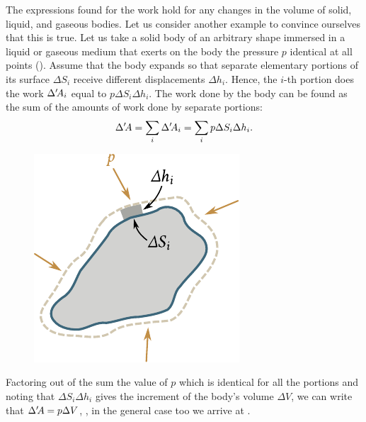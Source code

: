 The expressions found for the work hold for any changes in the volume of solid, liquid, and gaseous bodies. Let us consider another example to convince ourselves that this is true. Let us take a solid body of an arbitrary shape immersed in a liquid or gaseous medium that exerts on the body the pressure $p$ identical at all points (). Assume that the body expands so that separate elementary portions of its surface $\Delta S_i$ receive different displacements $\Delta h_i$. Hence, the $i$-th portion does the work $\Delta'\!A_i$ equal to $p\Delta S_i\Delta h_i$. The work done by the body can be found as the sum of the amounts of work done by separate portions:
\begin{equation*}
	\Delta'\!A = \sum_i\Delta'\!A_i = \sum_i p \Delta S_i \Delta h_i.
\end{equation*}

\begin{figure}[t]
	\begin{center}
		\includegraphics[scale=1.0]{figures/ch_10/fig_10_3.pdf}
		\caption[]{}
		\label{fig:10_3}
	\end{center}
	\vspace{-0.8cm}
\end{figure}

\noindent
Factoring out of the sum the value of $p$ which is identical for all the portions and noting that $\Delta S_i\Delta h_i$ gives the increment of the body's volume $\Delta V$, we can write that $\Delta'\!A=p\Delta V$, \ie, in the general case too we arrive at .

